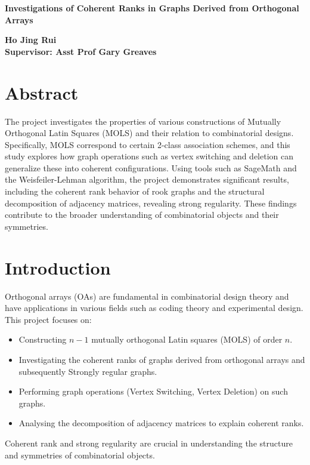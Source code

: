 \documentclass[12pt]{article}
\begin{document}
\begin{titlepage}
    \centering
    \vspace*{1in}
    \Large\textbf{Investigations of Coherent Ranks in Graphs Derived from Orthogonal Arrays}
    \vspace{1in}

    \large\textbf{Ho Jing Rui}\\
    \textbf{Supervisor: Asst Prof Gary Greaves}\\
    \vfill
\end{titlepage}

\section*{Abstract}
The project investigates the properties of various constructions of Mutually Orthogonal Latin Squares (MOLS) and their relation to combinatorial designs. Specifically, MOLS correspond to certain 2-class association schemes, and this study explores how graph operations such as vertex switching and deletion can generalize these into coherent configurations. Using tools such as SageMath and the Weisfeiler-Lehman algorithm, the project demonstrates significant results, including the coherent rank behavior of rook graphs and the structural decomposition of adjacency matrices, revealing strong regularity. These findings contribute to the broader understanding of combinatorial objects and their symmetries.

\newpage
\tableofcontents
\newpage

\section{Introduction}
Orthogonal arrays (OAs) are fundamental in combinatorial design theory and have applications in various fields such as coding theory and experimental design. This project focuses on:
\begin{itemize}
    \item Constructing \(n-1\) mutually orthogonal Latin squares (MOLS) of order \(n\).
    \item Investigating the coherent ranks of graphs derived from orthogonal arrays and subsequently Strongly regular graphs.
    \item Performing graph operations (Vertex Switching, Vertex Deletion) on such graphs.
    \item Analysing the decomposition of adjacency matrices to explain coherent ranks.
\end{itemize}
Coherent rank and strong regularity are crucial in understanding the structure and symmetries of combinatorial objects.
\end{document}
